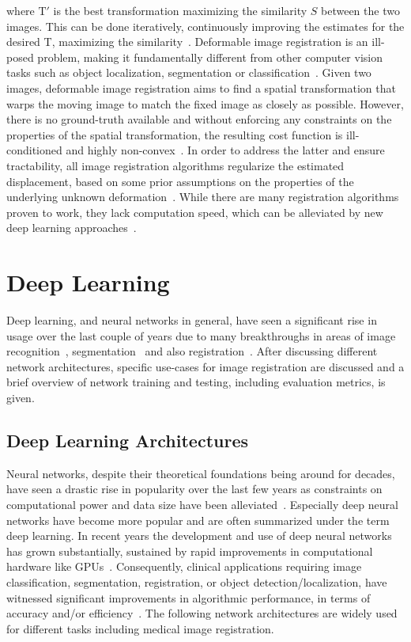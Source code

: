 where $\text{T}'$ is the best transformation maximizing the similarity $S$ between the two images. This can be done iteratively, continuously improving the estimates for the desired T, maximizing the similarity~\cite{Chen2020}. Deformable image registration is an ill-posed problem, making it fundamentally different from other computer vision tasks such as object localization, segmentation or classification~\cite{Fu2020}. Given two images, deformable image registration aims to find a spatial transformation that warps the moving image to match the fixed image as closely as possible. However, there is no ground-truth available and without enforcing any constraints on the properties of the spatial transformation, the resulting cost function is ill-conditioned and highly non-convex~\cite{Chen2020}. In order to address the latter and ensure tractability, all image registration algorithms regularize the estimated displacement, based on some prior assumptions on the properties of the underlying unknown deformation~\cite{Chen2020}. While there are many registration algorithms proven to work, they lack computation speed, which can be alleviated by new deep learning approaches~\cite{Fu2020}.


\section{Deep Learning} \label{Sec:DeepLearning}
Deep learning, and neural networks in general, have seen a significant rise in usage over the last couple of years due to many breakthroughs in areas of image recognition~\cite{Xu2023}, segmentation~\cite{U-Net} and also registration~\cite{Voxelmorph}. After discussing different network architectures, specific use-cases for image registration are discussed and a brief overview of network training and testing, including evaluation metrics, is given.

\subsection{Deep Learning Architectures} \label{SubSec:DeepLearningArchitectures}
Neural networks, despite their theoretical foundations being around for decades, have seen a drastic rise in popularity over the last few years as constraints on computational power and data size have been alleviated~\cite{Chen2020}. Especially deep neural networks have become more popular and are often summarized under the term deep learning. In recent years the development and use of deep neural networks has grown substantially, sustained by rapid improvements in computational hardware like GPUs~\cite{Chen2023}. Consequently, clinical applications requiring image classification, segmentation, registration, or object detection/localization, have witnessed significant improvements in algorithmic performance, in terms of accuracy and/or efficiency~\cite{Chen2020}. The following network architectures are widely used for different tasks including medical image registration.


